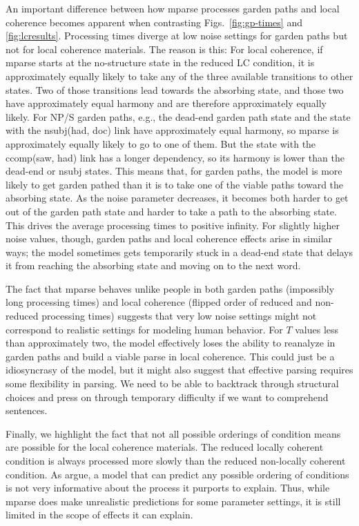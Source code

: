 \documentclass[a4paper, 12pt]{article}
\begin{document}
An important difference between how mparse processes garden paths and local
coherence becomes apparent when contrasting Figs.~\ref{fig:gp-times} and
\ref{fig:lcresults}. Processing times diverge at low noise settings for garden
paths but not for local coherence materials. The reason is this: For local
coherence, if mparse starts at the no-structure state in the reduced LC
condition, it is approximately equally likely to take any of the three
available transitions to other states.  Two of those transitions lead towards
the absorbing state, and those two have approximately equal harmony and are
therefore approximately equally likely. For NP/S garden paths, e.g.,
the dead-end garden path state and the state with the nsubj(had, doc) link have
approximately equal harmony, so mparse is approximately equally likely to go to
one of them.  But the state with the ccomp(saw, had) link has a longer
dependency, so its harmony is lower than the dead-end or nsubj states. This
means that, for garden paths, the model is more likely to get garden pathed
than it is to take one of the viable paths toward the absorbing state. As the
noise parameter decreases, it becomes both harder to get out of the garden path
state and harder to take a path to the absorbing state. This drives the average
processing times to positive infinity. For slightly higher noise values,
though, garden paths and local coherence effects arise in similar ways; the
model sometimes gets temporarily stuck in a dead-end state that delays it from
reaching the absorbing state and moving on to the next word.

The fact that mparse behaves unlike people in both garden paths (impossibly
long processing times) and local coherence (flipped order of reduced and
non-reduced processing times) suggests that very low noise settings might not
correspond to realistic settings for modeling human behavior. For $T$ values
less than approximately two, the model effectively loses the ability to
reanalyze in garden paths and build a viable parse in local coherence. This
could just be a idiosyncrasy of the model, but it might also suggest that
effective parsing requires some flexibility in parsing. We need to be able to
backtrack through structural choices and press on through temporary difficulty
if we want to comprehend sentences. 

Finally, we highlight the fact that not all possible orderings of condition
means are possible for the local coherence materials. The reduced locally
coherent condition is always processed more slowly than the reduced non-locally
coherent condition. As \cite{roberts2000how} argue, a model that can predict
any possible ordering of conditions is not very informative about the process
it purports to explain. Thus, while mparse does make unrealistic predictions
for some parameter settings, it is still limited in the scope of effects it can
explain.
\end{document}

